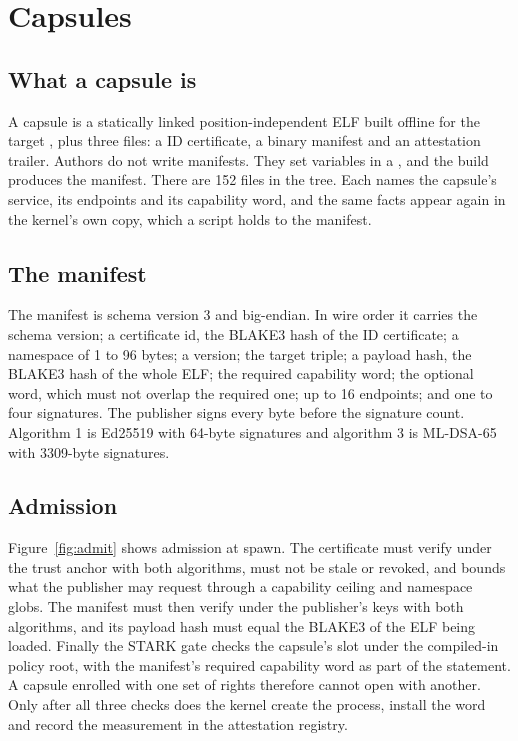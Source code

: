 \section{Capsules}\label{sec:capsules}

\subsection{What a capsule is}

A capsule is a statically linked position-independent ELF built offline for the target , plus three files: a \nonos{} ID certificate, a binary manifest and an attestation trailer. Authors do not write manifests. They set  variables in a , and the build produces the manifest. There are 152  files in the tree. Each names the capsule's service, its endpoints and its capability word, and the same facts appear again in the kernel's own copy, which a script holds to the manifest.

\subsection{The manifest}

The manifest is schema version 3 and big-endian. In wire order it carries the schema version; a certificate id, the BLAKE3 hash of the \nonos{} ID certificate; a namespace of 1 to 96 bytes; a version; the target triple; a payload hash, the BLAKE3 hash of the whole ELF; the required capability word; the optional word, which must not overlap the required one; up to 16 endpoints; and one to four signatures. The publisher signs every byte before the signature count. Algorithm 1 is Ed25519 with 64-byte signatures and algorithm 3 is ML-DSA-65 with 3309-byte signatures.

\subsection{Admission}

Figure~\ref{fig:admit} shows admission at spawn. The certificate must verify under the trust anchor with both algorithms, must not be stale or revoked, and bounds what the publisher may request through a capability ceiling and namespace globs. The manifest must then verify under the publisher's keys with both algorithms, and its payload hash must equal the BLAKE3 of the ELF being loaded. Finally the STARK gate checks the capsule's slot under the compiled-in policy root, with the manifest's required capability word as part of the statement. A capsule enrolled with one set of rights therefore cannot open with another. Only after all three checks does the kernel create the process, install the word and record the measurement in the attestation registry.

